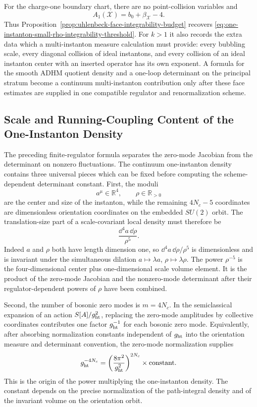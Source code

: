 For the charge-one boundary chart, there are no point-collision variables
and
\[
  A_1(\mathcal X)=b_0+\beta_{\mathcal X}-4 .
\]
Thus Proposition~\ref{prop:uhlenbeck-face-integrability-budget} recovers
\eqref{eq:one-instanton-small-rho-integrability-threshold}.  For \(k>1\) it
also records the extra data which a multi-instanton measure calculation must
provide: every bubbling scale, every diagonal collision of ideal instantons,
and every collision of an ideal instanton center with an inserted operator
has its own exponent.  A formula for the smooth ADHM quotient density and a
one-loop determinant on the principal stratum become a continuum
multi-instanton contribution only after these face estimates are supplied in
one compatible regulator and renormalization scheme.

\subsection{Scale and Running-Coupling Content of the One-Instanton Density}
\label{subsec:one-instanton-density-rg-content}

The preceding finite-regulator formula separates the zero-mode Jacobian from
the determinant on nonzero fluctuations.  The continuum one-instanton density
contains three universal pieces which can be fixed before computing the
scheme-dependent determinant constant.  First, the moduli
\[
  a^\mu\in\mathbb R^4,\qquad \rho\in\mathbb R_{>0}
\]
are the center and size of the instanton, while the remaining
\(4N_c-5\) coordinates are dimensionless orientation coordinates on the
embedded \(SU(2)\) orbit.  The translation-size part of a scale-covariant
local density must therefore be
\[
  \frac{\dd^4a\,\dd\rho}{\rho^5}.
\]
Indeed \(a\) and \(\rho\) both have length dimension one, so
\(\dd^4a\,\dd\rho/\rho^5\) is dimensionless and is invariant under the
simultaneous dilation \(a\mapsto\lambda a\), \(\rho\mapsto\lambda\rho\).
The power \(\rho^{-5}\) is the four-dimensional center plus one-dimensional
scale volume element.  It is the product of the zero-mode Jacobian and the
nonzero-mode determinant after their regulator-dependent powers of \(\rho\)
have been combined.

Second, the number of bosonic zero modes is \(m=4N_c\).  In the
semiclassical expansion of an action \(S[A]/g_{\rm ht}^2\), replacing the
zero-mode amplitudes by collective coordinates contributes one factor
\(g_{\rm ht}^{-1}\) for each bosonic zero mode.  Equivalently, after absorbing
normalization constants independent of \(g_{\rm ht}\) into the orientation
measure and determinant convention, the zero-mode normalization supplies
\[
  g_{\rm ht}^{-4N_c}
  =
  \left(\frac{8\pi^2}{g_{\rm ht}^2}\right)^{2N_c}
  \times
  \hbox{constant}.
\]
This is the origin of the power multiplying the one-instanton density.  The
constant depends on the precise normalization of the path-integral density
and of the invariant volume on the orientation orbit.

